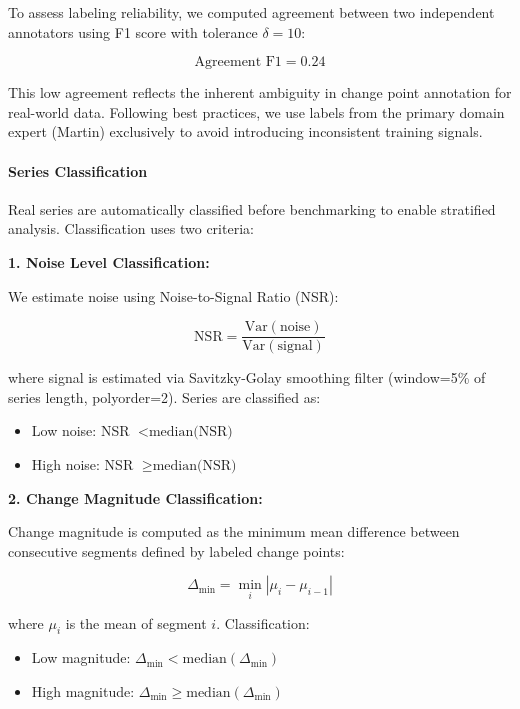 To assess labeling reliability, we computed agreement between two independent annotators using F1 score with tolerance $\delta=10$:

\begin{equation}
\text{Agreement F1} = 0.24
\end{equation}

This low agreement reflects the inherent ambiguity in change point annotation for real-world data. Following best practices, we use labels from the primary domain expert (Martin) exclusively to avoid introducing inconsistent training signals.

\paragraph{Series Classification}

Real series are automatically classified before benchmarking to enable stratified analysis. Classification uses two criteria:

\textbf{1. Noise Level Classification:}

We estimate noise using Noise-to-Signal Ratio (NSR):

\begin{equation}
\text{NSR} = \frac{\text{Var}(\text{noise})}{\text{Var}(\text{signal})}
\end{equation}

where signal is estimated via Savitzky-Golay smoothing filter (window=5\% of series length, polyorder=2). Series are classified as:
\begin{itemize}
    \item Low noise: NSR $< \text{median(NSR)}$
    \item High noise: NSR $\geq \text{median(NSR)}$
\end{itemize}

\textbf{2. Change Magnitude Classification:}

Change magnitude is computed as the minimum mean difference between consecutive segments defined by labeled change points:

\begin{equation}
\Delta_{\text{min}} = \min_{i} |\mu_i - \mu_{i-1}|
\end{equation}

where $\mu_i$ is the mean of segment $i$. Classification:
\begin{itemize}
    \item Low magnitude: $\Delta_{\text{min}} < \text{median}(\Delta_{\text{min}})$
    \item High magnitude: $\Delta_{\text{min}} \geq \text{median}(\Delta_{\text{min}})$
\end{itemize}

